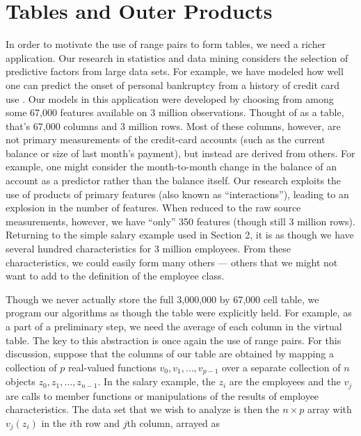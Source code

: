 \documentclass[12pt]{article}
\begin{document}
\section{Tables and Outer Products}

  In order to motivate the use of range pairs to form tables, we need
a richer application. Our research in statistics and data mining
considers the selection of predictive factors from large data sets.
For example, we have modeled how well one can predict the onset of
personal bankruptcy from a history of credit card use
\citep{fosterstine00}.  Our models in this application were developed
by choosing from among some 67,000 features available on 3 million
observations.  Thought of as a table, that's 67,000 columns and 3
million rows.  Most of these columns, however, are not primary
measurements of the credit-card accounts (such as the current balance
or size of last month's payment), but instead are derived from others.
For example, one might consider the month-to-month change in the
balance of an account as a predictor rather than the balance itself.
Our research exploits the use of products of primary features (also
known as ``interactions''), leading to an explosion in the number of
features.  When reduced to the raw source measurements, however, we
have ``only'' 350 features (though still 3 million rows).  Returning
to the simple salary example used in Section 2, it is as though we
have several hundred characteristics for 3 million employees.  From
these characteristics, we could easily form many others --- others
that we might not want to add to the definition of the employee class.


  Though we never actually store the full 3,000,000 by 67,000 cell
table, we program our algorithms as though the table were explicitly
held.  For example, as a part of a preliminary step, we need the
average of each column in the virtual table.  The key to this
abstraction is once again the use of range pairs.  For this
discussion, suppose that the columns of our table are obtained by
mapping a collection of $p$ real-valued functions
$v_0,v_1,\ldots,v_{p-1}$ over a separate collection of $n$ objects
$z_0, z_1, \ldots, z_{n-1}$.  In the salary example, the $z_i$ are the
employees and the $v_j$ are calls to member functions or
manipulations of the results of employee characteristics.  The data
set that we wish to analyze is then the $n \times p$ array with
$v_j(z_i)$ in the $i$th row and $j$th column, arrayed as
\end{document}
